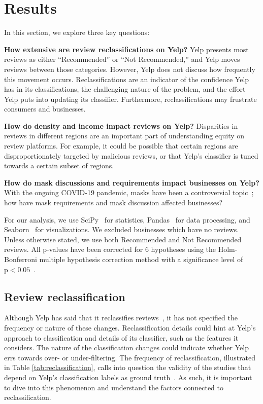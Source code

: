 \section{Results} \label{sec:rim:results}

In this section, we explore three key questions:

\textbf{How extensive are review reclassifications on Yelp?} Yelp presents most reviews as either ``Recommended'' or ``Not Recommended,'' and Yelp moves reviews between those categories. However, Yelp does not discuss how frequently this movement occurs. Reclassifications are an indicator of the confidence Yelp has in its classifications, the challenging nature of the problem, and the effort Yelp puts into updating its classifier. Furthermore, reclassifications may frustrate consumers and businesses.

\textbf{How do density and income impact reviews on Yelp?} Disparities in reviews in different regions are an important part of understanding equity on review platforms. For example, it could be possible that certain regions are disproportionately targeted by malicious reviews, or that Yelp's classifier is tuned towards a certain subset of regions.

\textbf{How do mask discussions and requirements impact businesses on Yelp?} With the ongoing COVID-19 pandemic, masks have been a controversial topic~\cite{pascual2021toxicity}; how have mask requirements and mask discussion affected businesses?

For our analysis, we use SciPy~\cite{2020SciPy-NMeth} for statistics, Pandas~\cite{mckinney-proc-scipy-2010} for data processing, and Seaborn~\cite{waskom2020seaborn} for visualizations. We excluded businesses which have no reviews. Unless otherwise stated, we use both Recommended and Not Recommended reviews. All p-values have been corrected for 6 hypotheses using the Holm-Bonferroni multiple hypothesis correction method with a significance level of $\text{p}<0.05$~\cite{seabold2010statsmodels}.


\subsection{Review reclassification} \label{subsec:rim:review_reclassification}

Although Yelp has said that it reclassifies reviews~\cite{yelp2010recommend}, it has not specified the frequency or nature of these changes. Reclassification details could hint at Yelp's approach to classification and details of its classifier, such as the features it considers. The nature of the classification changes could indicate whether Yelp errs towards over- or under-filtering. The frequency of reclassification, illustrated in Table \ref{tab:reclassification}, calls into question the validity of the studies that depend on Yelp's classification labels as ground truth~\cite{rayana2015collective,kc2016temporal,mukherjee2013yelp,zhu2021ifspard,shehnepoor2017netspam,yao2017automated}. As such, it is important to dive into this phenomenon and understand the factors connected to reclassification.

